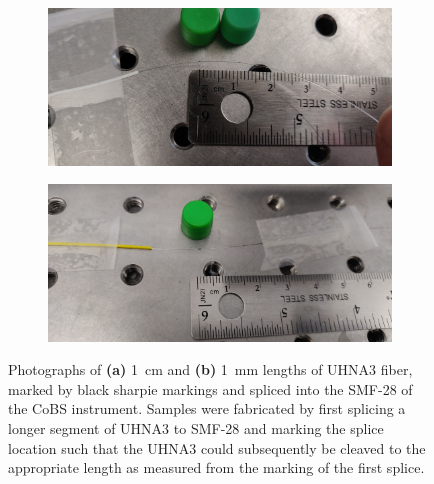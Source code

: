 \begin{figure}[t]
    \centering
    \begin{subfigure}[b]{0.49\textwidth}
        \centering
        \includegraphics[width=\textwidth]{figs/4-Raman/1cm UHNA3.jpeg}
        \caption{}
        \label{fig:Raman:1cmUHNA3pic}
    \end{subfigure}
    \hfill
    \begin{subfigure}[b]{0.49\textwidth}
        \centering
        \includegraphics[width=\textwidth]{figs/4-Raman/1mm UHNA3 in apparatus.jpeg}
        \caption{}
        \label{fig:Raman:1mmUHNA3pic}
    \end{subfigure}
    \caption[Photographs of \SI{1}{\centi\meter} and \SI{1}{\milli\meter} lengths of \ac{UHNA3} fiber.]{Photographs of \textbf{(a)} \SI{1}{\centi\meter} and \textbf{(b)} \SI{1}{\milli\meter} lengths of \ac{UHNA3} fiber, marked by black sharpie markings and spliced into the \ac{SMF-28} of the \ac{CoBS} instrument. Samples were fabricated by first splicing a longer segment of \ac{UHNA3} to \ac{SMF-28} and marking the splice location such that the \ac{UHNA3} could subsequently be cleaved to the appropriate length as measured from the marking of the first splice.}
    \label{fig:Raman:UHNA3pics}
\end{figure}

